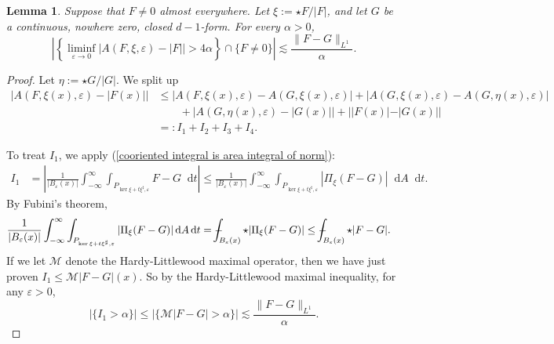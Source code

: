 \documentclass[reqno,11pt]{amsart}
\newcommand*\dif{\mathop{}\!\mathrm{d}}
\newtheorem{lemma}[theorem]{Lemma}
\theoremstyle{definition}
\numberwithin{equation}{section}
\def\Xint#1{\mathchoice
{\XXint\displaystyle\textstyle{#1}}%
{\XXint\textstyle\scriptstyle{#1}}%
{\XXint\scriptstyle\scriptscriptstyle{#1}}%
{\XXint\scriptscriptstyle\scriptscriptstyle{#1}}%
\!\int}
\def\XXint#1#2#3{{\setbox0=\hbox{$#1{#2#3}{\int}$ }
\vcenter{\hbox{$#2#3$ }}\kern-.6\wd0}}
\def\dashint{\Xint-}
\begin{document}
\begin{lemma}\label{PLDT bound mass}
Suppose that $F \neq 0$ almost everywhere.
Let $\xi := \star F/|F|$, and let $G$ be a continuous, nowhere zero, closed $d - 1$-form.
For every $\alpha > 0$,
$$\left|\left\{\liminf_{\varepsilon \to 0} |A(F, \xi, \varepsilon) - |F|| > 4\alpha\right\} \cap \{F \neq 0\}\right| \lesssim \frac{\|F - G\|_{L^1}}{\alpha}.$$
\end{lemma}
\begin{proof}
Let $\eta := \star G/|G|$.
We split up
\begin{align*}
|A(F, \xi(x), \varepsilon) - |F(x)||
&\leq |A(F, \xi(x), \varepsilon) - A(G, \xi(x), \varepsilon)| + |A(G, \xi(x), \varepsilon) - A(G, \eta(x), \varepsilon)| \\
&\qquad + |A(G, \eta(x), \varepsilon) - |G(x)|| + ||F(x)| - |G(x)||\\
&=: I_1 + I_2 + I_3 + I_4.
\end{align*}

To treat $I_1$, we apply (\ref{cooriented integral is area integral of norm}):
\begin{align*}
I_1
&= \left|\frac{1}{|B_\varepsilon(x)|} \int_{-\infty}^\infty \int_{P_{\ker \xi + t\xi^\sharp, \varepsilon}} F - G \dif t\right| 
\leq \frac{1}{|B_\varepsilon(x)|} \int_{-\infty}^\infty \int_{P_{\ker \xi + t\xi^\sharp, \varepsilon}} |\Pi_\xi(F - G)| \dif A \dif t.
\end{align*}
By Fubini's theorem, 
\begin{align*}
\frac{1}{|B_\varepsilon(x)|} \int_{-\infty}^\infty \int_{P_{\ker \xi + t\xi^\sharp, \varepsilon}} |\Pi_\xi(F - G)| \dif A \dif t
&= \dashint_{B_\varepsilon(x)} \star|\Pi_\xi(F - G)| \leq \dashint_{B_\varepsilon(x)} \star |F - G|.
\end{align*}
If we let $\mathcal M$ denote the Hardy-Littlewood maximal operator, then we have just proven $I_1 \leq \mathcal M|F - G|(x)$.
So by the Hardy-Littlewood maximal inequality, for any $\varepsilon > 0$,
$$|\{I_1 > \alpha\}| \leq |\{\mathcal M |F - G| > \alpha\}| \lesssim \frac{\|F - G\|_{L^1}}{\alpha}.$$


\end{proof}
\end{document}
